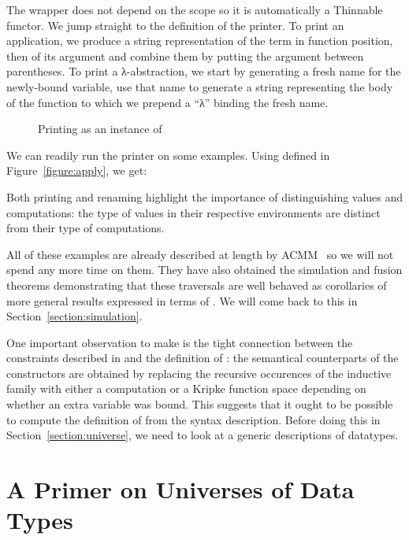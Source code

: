 The wrapper  does not depend on the scope \AB{$\Gamma$} so it is automatically
a Thinnable functor. We jump straight
to the definition of the printer. To print an application, we produce
a string representation of the term in function position, then of its argument and combine
them by putting the argument between parentheses. To print a λ-abstraction,
we start by generating a fresh name for the newly-bound variable, use that
name to generate a string representing the body of the function to which we
prepend a ``λ'' binding the fresh name.

\begin{figure}[h]
\caption{Printing as an instance of \semrec{}}\label{fig:printing}
\end{figure}

We can readily run the printer on some examples. Using  defined
in Figure~\ref{figure:apply}, we get:


Both printing and renaming highlight the importance of distinguishing
values and computations: the type of values in their respective
environments are distinct from their type of computations.

All of these examples are already described at length by ACMM~\citeyear{allais2017type}
so we will not spend any
more time on them. They have also obtained the simulation and fusion
theorems demonstrating that these traversals are well behaved as
corollaries of more general results expressed in terms of \semfun{}.
We will come back to this in Section~\ref{section:simulation}.

One important observation to make is the tight connection between the constraints
described in \semrec{} and the definition of : the semantical counterparts
of the  constructors are obtained by replacing the recursive occurences of
the inductive family with either a computation or a Kripke function space depending
on whether an extra variable was bound. This suggests that it ought to be possible
to compute the definition of \semrec{} from the syntax description. Before doing this
in Section~\ref{section:universe}, we need to look at a generic descriptions of
datatypes.




\section{A Primer on Universes of Data Types}\label{section:data}

